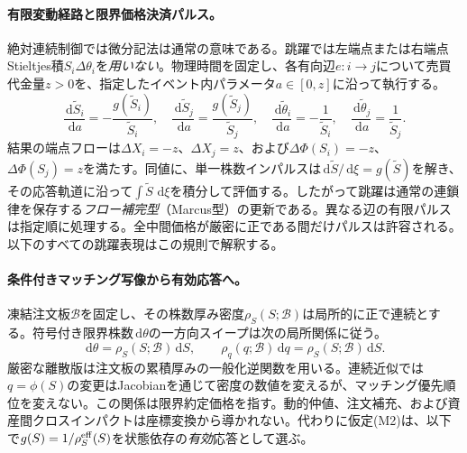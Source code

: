 \documentclass[11pt]{article}
\numberwithin{equation}{section}
\theoremstyle{definition}
\theoremstyle{remark}
\newcommand{\dd}{\,\mathrm{d}}
\begin{document}
\paragraph{有限変動経路と限界価格決済パルス。}
絶対連続制御では微分記法は通常の意味である。跳躍では左端点または右端点Stieltjes積$S_i\Delta\theta_i$を\emph{用いない}。物理時間を固定し、各有向辺$e:i\to j$について売買代金量$z>0$を、指定したイベント内パラメータ$a\in[0,z]$に沿って執行する。
\begin{equation}\label{eq:pulse-flow}
\frac{\dd \widetilde S_i}{\dd a}=-\frac{g(\widetilde S_i)}{\widetilde S_i},\quad
\frac{\dd \widetilde S_j}{\dd a}=\frac{g(\widetilde S_j)}{\widetilde S_j},\quad
\frac{\dd\widetilde\theta_i}{\dd a}=-\frac{1}{\widetilde S_i},\quad
\frac{\dd\widetilde\theta_j}{\dd a}=\frac{1}{\widetilde S_j}.
\end{equation}
結果の端点フローは$\Delta X_i=-z$、$\Delta X_j=z$、および$\Delta\Phi(S_i)=-z$、$\Delta\Phi(S_j)=z$を満たす。同値に、単一株数インパルスは$\dd\widetilde S/\dd\xi=g(\widetilde S)$を解き、その応答軌道に沿って$\int\widetilde S\,\dd\xi$を積分して評価する。したがって跳躍は通常の連鎖律を保存する\emph{フロー補完型}（Marcus型）の更新である。異なる辺の有限パルスは指定順に処理する。全中間価格が厳密に正である間だけパルスは許容される。以下のすべての跳躍表現はこの規則で解釈する。

\paragraph{条件付きマッチング写像から有効応答へ。} 凍結注文板$\mathcal B$を固定し、その株数厚み密度$\rho_S(S;\mathcal B)$は局所的に正で連続とする。符号付き限界株数$\dd\theta$の一方向スイープは次の局所関係に従う。
\begin{equation}\label{eq:frozen-depth}
\dd\theta=\rho_S(S;\mathcal B)\dd S,
\qquad \rho_q(q;\mathcal B)\dd q=\rho_S(S;\mathcal B)\dd S.
\end{equation}
厳密な離散版は注文板の累積厚みの一般化逆関数を用いる。連続近似では$q=\phi(S)$の変更はJacobianを通じて密度の数値を変えるが、マッチング優先順位を変えない。この関係は限界約定価格を指す。動的仲値、注文補充、および資産間クロスインパクトは座標変換から導かれない。代わりに仮定(M2)は、以下で$g(S)=1/\rho_S^{\rm eff}(S)$を状態依存の\emph{有効}応答として選ぶ。
\end{document}
